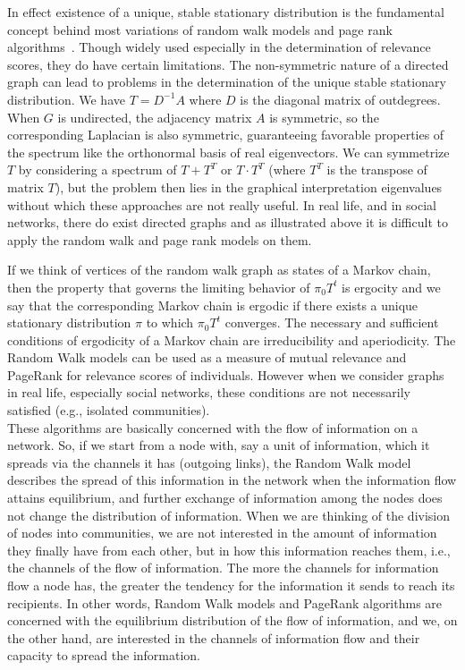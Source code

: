 \documentclass{sig-alternate}
\begin{document}
In effect  existence of a unique, stable stationary distribution is the fundamental concept behind most variations of  random walk models and page rank algorithms~\cite{tong,PageRank}. Though widely used especially in the determination of relevance scores, they do have certain limitations.
The non-symmetric nature of a directed graph can lead to problems in the determination of  the unique stable stationary distribution. We have $T=D^{-1}A$ where $D$ is the diagonal matrix of outdegrees. When $G$ is undirected, the adjacency matrix $A$ is symmetric, so the corresponding Laplacian is also symmetric, guaranteeing  favorable properties of the spectrum like the orthonormal basis of real eigenvectors. We can symmetrize $T$ by considering a spectrum of $T+T^T$ or $T \cdot T^T$ (where $T^T$ is the transpose of matrix $T$), but the problem then lies in the graphical interpretation eigenvalues without which these approaches are not really useful. In real life, and in social networks, there do exist directed graphs and as illustrated above it is difficult to apply  the random walk and page rank models on them.



If we think of vertices of the random walk graph as states of a Markov chain, then the property that governs the limiting behavior of $ \pi_0T^t$ is ergocity and we say that the corresponding Markov chain is ergodic if there exists a unique stationary distribution $\pi$ to which $ \pi_0T^t$ converges. The necessary and sufficient conditions of  ergodicity of a Markov chain are irreducibility and aperiodicity. The Random Walk models can be used as a measure of mutual relevance  and PageRank for relevance scores of individuals. However when we consider graphs in real life, especially social networks, these conditions are not necessarily satisfied (e.g., isolated communities).\\

These algorithms are basically concerned with the flow of information on a network. So, if we start from a node with, say a unit of information, which it spreads via the channels it has (outgoing links), the Random Walk model describes the spread of this information in the network  when the information flow attains equilibrium, and further exchange of information among the nodes does not change the distribution of information. When we are thinking of the division of nodes into communities, we are not interested in the amount of information they finally have from each other, but in how this information reaches them, i.e., the channels of the flow of information. The more the channels for information flow a node has, the greater the tendency for the information it sends to reach its recipients. In other words, Random Walk models and PageRank algorithms are concerned with the equilibrium distribution of the flow of information, and we, on the other hand, are interested in the channels of  information flow and their capacity to spread the information.
\end{document}
